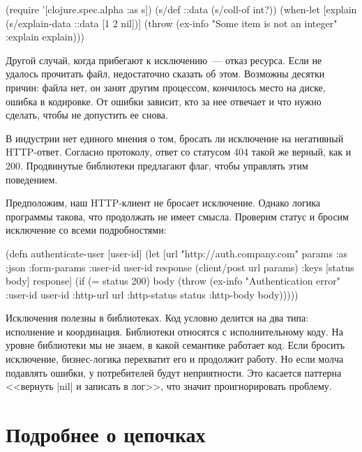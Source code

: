 \begin{english}
  \begin{clojure}
(require '[clojure.spec.alpha :as s])
(s/def ::data (s/coll-of int?))
(when-let [explain (s/explain-data ::data [1 2 nil])]
  (throw (ex-info "Some item is not an integer" {:explain explain})))
  \end{clojure}
\end{english}

Другой случай, когда прибегают к исключению~--- отказ ресурса. Если не удалось
прочитать файл, недостаточно сказать об этом. Возможны десятки причин: файла
нет, он занят другим процессом, кончилось место на диске, ошибка в кодировке. От
ошибки зависит, кто за нее отвечает и что нужно сделать, чтобы не допустить ее
снова.

В индустрии нет единого мнения о том, бросать ли исключение на негативный
HTTP-ответ. Согласно протоколу, ответ со статусом 404 такой же верный, как и
200. Продвинутые библиотеки предлагают флаг, чтобы управлять этим поведением.

Предположим, наш HTTP-клиент не бросает исключение. Однако логика программы
такова, что продолжать не имеет смысла. Проверим статус и бросим исключение со
всеми подробностями:

\begin{english}
  \begin{clojure}
(defn authenticate-user [user-id]
  (let [url "http://auth.company.com"
        params {:as :json :form-params {:user-id user-id}}
        response (client/post url params)
        {:keys [status body]} response]
    (if (= status 200)
      body
      (throw (ex-info "Authentication error"
                      {:user-id user-id
                       :http-url url
                       :http-status status
                       :http-body body})))))
  \end{clojure}
\end{english}

Исключения полезны в библиотеках. Код условно делится на два типа: исполнение и
координация. Библиотеки относятся с исполнительному коду. На уровне библиотеки
мы не знаем, в какой семантике работает код. Если бросить исключение,
бизнес-логика перехватит его и продолжит работу. Но если молча подавлять ошибки,
у потребителей будут неприятности. Это касается паттерна <<вернуть \spverb|nil|
и записать в лог>>, что значит проигнорировать проблему.

\section{Подробнее о цепочках}

